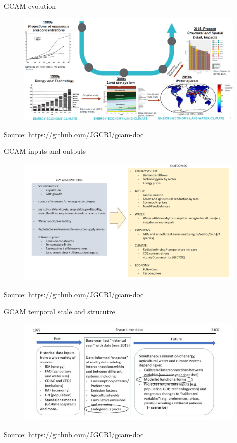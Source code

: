 \begin{frame}{GCAM evolution}
\begin{figure}
    \centering
    \includegraphics[width = 0.95\linewidth]{extraFigs/GCAM_evolution.jpg}
\end{figure}
\vfill\hfill \tiny{Source: \url{https://github.com/JGCRI/gcam-doc}}
\end{frame}

\begin{frame}{GCAM inputs and outputs}
\begin{figure}
    \centering
    \includegraphics[width = 0.95\linewidth]{extraFigs/GCAM_input_output.png}
\end{figure}
\vfill\hfill \footnotesize{Source: \url{https://github.com/JGCRI/gcam-doc}}
\end{frame}

\begin{frame}{GCAM temporal scale and strucutre}
\begin{figure}
    \centering
    \includegraphics[width = 0.95\linewidth]{extraFigs/GCAM_temporal_structure.jpg}
\end{figure}
\vfill\hfill \tiny{Source: \url{https://github.com/JGCRI/gcam-doc}}
\end{frame}

